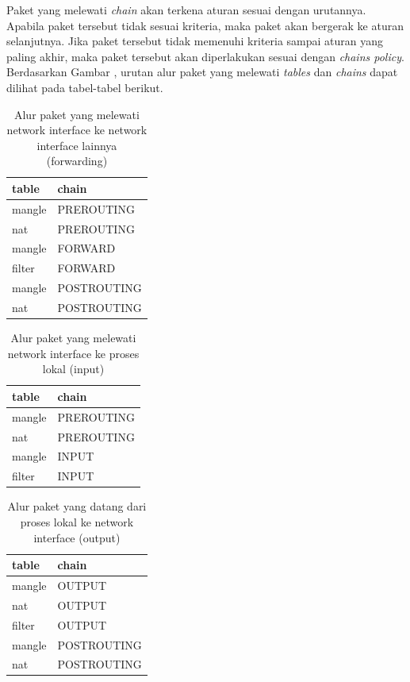 Paket yang melewati \textit{chain} akan terkena aturan sesuai dengan urutannya. Apabila paket tersebut tidak sesuai kriteria, maka paket akan bergerak ke aturan selanjutnya. Jika paket tersebut tidak memenuhi kriteria sampai aturan yang paling akhir, maka paket tersebut akan diperlakukan sesuai dengan \textit{chain\textquotesingle s policy}. 
Berdasarkan Gambar , urutan alur paket yang melewati \textit{tables} dan \textit{chains} dapat dilihat pada tabel-tabel berikut.

\begin{table}[H]
	\caption{Alur paket yang melewati network interface ke network interface lainnya (forwarding)}
	\label{table:network_to_network}
	\centering
	\begin{tabular}{ll}
		\hline
		\rowcolor[HTML]{C0C0C0} 
		table  & chain       \\ \hline
		mangle & PREROUTING  \\
		nat    & PREROUTING  \\
		mangle & FORWARD     \\
		filter & FORWARD     \\
		mangle & POSTROUTING \\
		nat    & POSTROUTING \\ \hline
	\end{tabular}
\end{table}

\begin{table}[H]
	\caption{Alur paket yang melewati network interface ke proses lokal (input)}
	\label{table:network_to_local}
	\centering
	\begin{tabular}{ll}
		\hline
		\rowcolor[HTML]{C0C0C0} 
		table  & chain      \\ \hline
		mangle & PREROUTING \\
		nat    & PREROUTING \\
		mangle & INPUT      \\
		filter & INPUT      \\ \hline
	\end{tabular}	
\end{table}

\begin{table}[H]
	\caption{Alur paket yang datang dari proses lokal ke network interface (output)}
	\label{table:local_to_network}
	\centering
	\begin{tabular}{ll}
		\hline
		\rowcolor[HTML]{C0C0C0} 
		table  & chain       \\ \hline
		mangle & OUTPUT      \\
		nat    & OUTPUT      \\
		filter & OUTPUT      \\
		mangle & POSTROUTING \\
		nat    & POSTROUTING \\ \hline
	\end{tabular}
\end{table}

